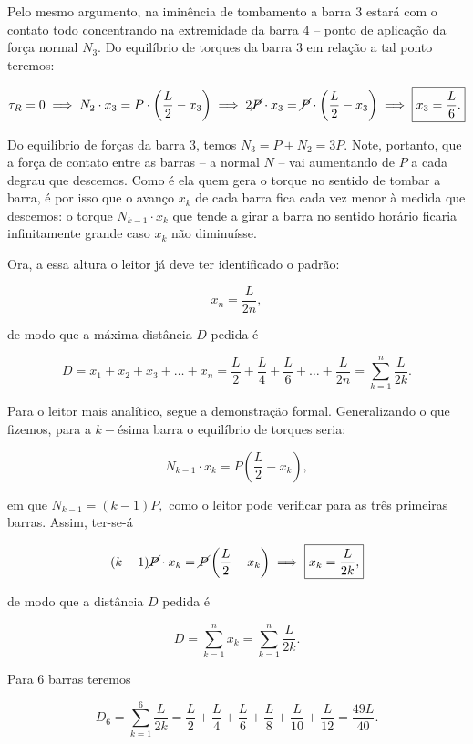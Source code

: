 \begin{exemplo}
Pelo mesmo argumento, na iminência de tombamento a barra 3 estará com o contato todo concentrando na extremidade da barra 4 -- ponto de aplicação da força normal $N_3.$ Do equilíbrio de torques da barra 3 em relação a tal ponto teremos:

$$ \tau_R = 0 \implies N_2 \cdot x_3 = P \cdot \left( \dfrac{L}{2} - x_3 \right) \implies  2\cancel P \cdot x_3 = \cancel P \cdot \left( \dfrac{L}{2} - x_3 \right) \implies \boxed{x_3= \dfrac{L}{6}.}   $$

Do equilíbrio de forças da barra $3$, temos $N_3 = P + N_2 = 3P.$ Note, portanto, que a força de contato entre as barras -- a normal $N$ -- vai aumentando de $P$ a cada degrau que descemos. Como é ela quem gera o torque no sentido de tombar a barra, é por isso que o avanço $x_k$ de cada barra fica cada vez menor à medida que descemos: o torque $N_{k-1} \cdot x_{k}$ que tende a girar a barra no sentido horário ficaria infinitamente grande caso $x_k$ não diminuísse.

Ora, a essa altura o leitor já deve ter identificado o padrão:

$$x_n = \dfrac{L}{2n},$$

\noindent de modo que a máxima distância $D$ pedida é

$$ D =  x_1 + x_2 + x_3 + \dots + x_n = \dfrac{L}{2} + \dfrac{L}{4} + \dfrac{L}{6} + \dots + \dfrac{L}{2n} = \sum_{k=1}^n \dfrac{L}{2k}. $$

Para o leitor mais analítico, segue a demonstração formal. Generalizando o que fizemos, para a $k-$ésima barra o equilíbrio de torques seria:

$$ N_{k-1} \cdot x_k  = P \left( \dfrac{L}{2} - x_k \right), $$

\noindent em que $N_{k-1} = (k-1)P,$ como o leitor pode verificar para as três primeiras barras. Assim, ter-se-á

$$ (k-1) \cancel P \cdot x_k  = \cancel P \left( \dfrac{L}{2} - x_k \right) \implies \boxed{x_k = \dfrac{L}{2k},} $$

\noindent de modo que a distância $D$ pedida é

$$ \boxed{D =  \sum_{k=1}^n x_k =  \sum_{k=1}^n \dfrac{L}{2k}.} $$

Para $6$ barras teremos

$$ D_6 =  \sum_{k=1}^6 \dfrac{L}{2k} =  \dfrac{L}{2} + \dfrac{L}{4} + \dfrac{L}{6} +  \dfrac{L}{8} + \dfrac{L}{10} + \dfrac{L}{12}  = \dfrac{49L}{40} .$$

\end{exemplo}







